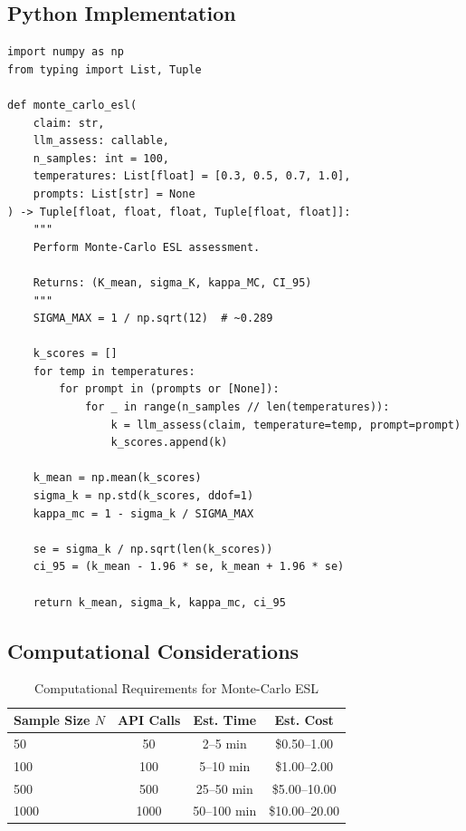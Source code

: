 \documentclass[11pt,a4paper]{article}
\theoremstyle{remark}
\begin{document}
\subsection{Python Implementation}

\begin{verbatim}
import numpy as np
from typing import List, Tuple

def monte_carlo_esl(
    claim: str,
    llm_assess: callable,
    n_samples: int = 100,
    temperatures: List[float] = [0.3, 0.5, 0.7, 1.0],
    prompts: List[str] = None
) -> Tuple[float, float, float, Tuple[float, float]]:
    """
    Perform Monte-Carlo ESL assessment.

    Returns: (K_mean, sigma_K, kappa_MC, CI_95)
    """
    SIGMA_MAX = 1 / np.sqrt(12)  # ~0.289

    k_scores = []
    for temp in temperatures:
        for prompt in (prompts or [None]):
            for _ in range(n_samples // len(temperatures)):
                k = llm_assess(claim, temperature=temp, prompt=prompt)
                k_scores.append(k)

    k_mean = np.mean(k_scores)
    sigma_k = np.std(k_scores, ddof=1)
    kappa_mc = 1 - sigma_k / SIGMA_MAX

    se = sigma_k / np.sqrt(len(k_scores))
    ci_95 = (k_mean - 1.96 * se, k_mean + 1.96 * se)

    return k_mean, sigma_k, kappa_mc, ci_95
\end{verbatim}

\subsection{Computational Considerations}

\begin{table}[h]
\centering
\caption{Computational Requirements for Monte-Carlo ESL}
\label{tab:compute}
\begin{tabular}{lccc}
\toprule
\textbf{Sample Size $N$} & \textbf{API Calls} & \textbf{Est. Time} & \textbf{Est. Cost} \\
\midrule
50 & 50 & 2--5 min & \$0.50--1.00 \\
100 & 100 & 5--10 min & \$1.00--2.00 \\
500 & 500 & 25--50 min & \$5.00--10.00 \\
1000 & 1000 & 50--100 min & \$10.00--20.00 \\
\bottomrule
\end{tabular}
\end{table}
\end{document}
